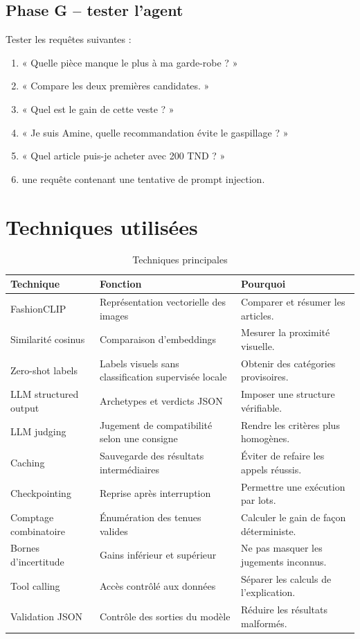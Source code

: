 \documentclass[11pt,a4paper]{article}
\begin{document}
\subsection{Phase G -- tester l'agent}

Tester les requêtes suivantes :

\begin{enumerate}[leftmargin=*]
    \item « Quelle pièce manque le plus à ma garde-robe ? »
    \item « Compare les deux premières candidates. »
    \item « Quel est le gain de cette veste ? »
    \item « Je suis Amine, quelle recommandation évite le gaspillage ? »
    \item « Quel article puis-je acheter avec 200 TND ? »
    \item une requête contenant une tentative de prompt injection.
\end{enumerate}

\section{Techniques utilisées}

\begin{table}[H]
\centering
\caption{Techniques principales}
\begin{tabularx}{\textwidth}{>{\raggedright\arraybackslash}p{4.2cm} X X}
\toprule
\textbf{Technique} & \textbf{Fonction} & \textbf{Pourquoi} \\
\midrule
FashionCLIP & Représentation vectorielle des images &
Comparer et résumer les articles. \\
Similarité cosinus & Comparaison d'embeddings &
Mesurer la proximité visuelle. \\
Zero-shot labels & Labels visuels sans classification supervisée locale &
Obtenir des catégories provisoires. \\
LLM structured output & Archetypes et verdicts JSON &
Imposer une structure vérifiable. \\
LLM judging & Jugement de compatibilité selon une consigne &
Rendre les critères plus homogènes. \\
Caching & Sauvegarde des résultats intermédiaires &
Éviter de refaire les appels réussis. \\
Checkpointing & Reprise après interruption &
Permettre une exécution par lots. \\
Comptage combinatoire & Énumération des tenues valides &
Calculer le gain de façon déterministe. \\
Bornes d'incertitude & Gains inférieur et supérieur &
Ne pas masquer les jugements inconnus. \\
Tool calling & Accès contrôlé aux données &
Séparer les calculs de l'explication. \\
Validation JSON & Contrôle des sorties du modèle &
Réduire les résultats malformés. \\
\bottomrule
\end{tabularx}
\end{table}
\end{document}
